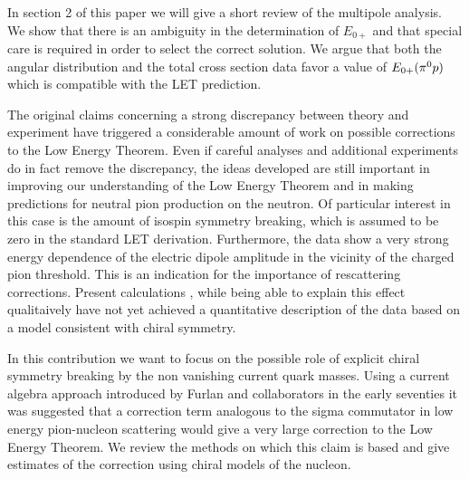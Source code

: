 In section 2 of this paper we will give a short review of the
multipole analysis. We show that there is an ambiguity in the
determination of $E_{0+}$  and that special care
is required in order to select the correct  solution. We argue
that both the angular distribution and the total cross section
data favor a value of $E_{0+}(\pi^0 p)$ which is compatible with the
LET prediction. 

The original claims concerning a strong discrepancy between theory
and experiment have triggered a considerable amount of work on
possible corrections to the Low Energy Theorem.
Even if careful analyses and additional experiments do
in fact remove the discrepancy, the ideas developed are still important
in improving our understanding of the Low Energy Theorem and in
making predictions for neutral pion production on the neutron.
Of particular interest in this case is the amount of isospin
symmetry breaking, which is assumed to be zero in the standard
LET derivation. Furthermore, the data show a very strong energy
dependence of the electric dipole amplitude in the vicinity of
the charged pion threshold. This is an indication for the importance
of rescattering corrections. Present calculations \cite{LYL91},
while being able to explain this effect qualitaively have not yet 
achieved a quantitative description of the data based on a model 
consistent with chiral symmetry.
     
In this contribution we want to focus on the possible
role  of explicit chiral symmetry breaking by  the non vanishing 
current quark masses. Using a current algebra approach introduced
by Furlan and collaborators \cite{FPV74} in the early seventies it 
was suggested \cite{NS89} that a correction term analogous to the 
sigma commutator in low energy pion-nucleon scattering would give
a very large correction to the Low Energy Theorem. We review
the methods on which this claim is based and give estimates
of the correction using  chiral models of the nucleon.
  
